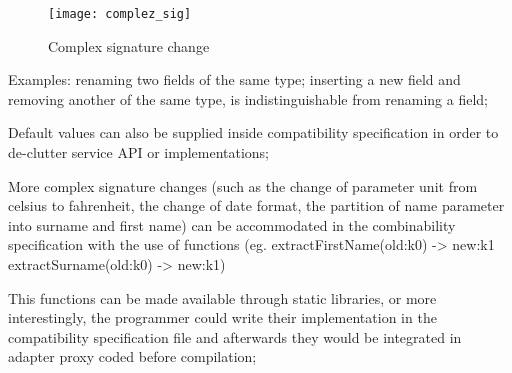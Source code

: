 \begin{figure}[htbp]
    \centering
    \texttt{[image: complez\_sig]}
    \caption{Complex signature change}
    \label{fig:complex}
\end{figure}

Examples:
renaming two fields of the same type;
inserting a new field and removing another of the same type, is indistinguishable from renaming a field;

Default values can also be supplied inside compatibility specification in order to de-clutter service API or implementations;

More complex signature changes (such as the change of parameter unit from celsius to fahrenheit, the change of date format, the partition of name parameter into surname and first name)
can be accommodated in the combinability specification with the use of functions (eg. extractFirstName(old:k0) -> new:k1  extractSurname(old:k0) -> new:k1)

This functions can be made available through static libraries, or more interestingly, the programmer could write their implementation in the compatibility specification file
and afterwards they would be integrated in adapter proxy coded before compilation;